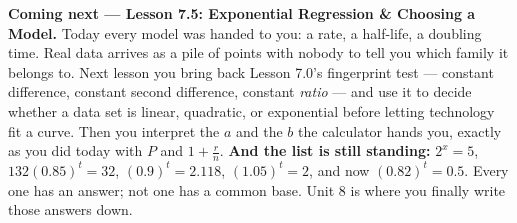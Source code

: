 \documentclass[10pt]{article}
\begin{document}
\begin{spiralbox}
\textbf{Coming next --- Lesson 7.5: Exponential Regression \& Choosing a Model.} Today every model was
handed to you: a rate, a half-life, a doubling time. Real data arrives as a pile of points with nobody
to tell you which family it belongs to. Next lesson you bring back Lesson 7.0's fingerprint test ---
constant difference, constant second difference, constant \emph{ratio} --- and use it to decide whether
a data set is linear, quadratic, or exponential before letting technology fit a curve. Then you
interpret the $a$ and the $b$ the calculator hands you, exactly as you did today with $P$ and
$1+\frac{r}{n}$. \textbf{And the list is still standing:} $2^{x}=5$, $132(0.85)^{t}=32$,
$(0.9)^{t}=2.118$, $(1.05)^{t}=2$, and now $(0.82)^{t}=0.5$. Every one has an answer; not one has a
common base. Unit 8 is where you finally write those answers down.
\end{spiralbox}
\end{document}
